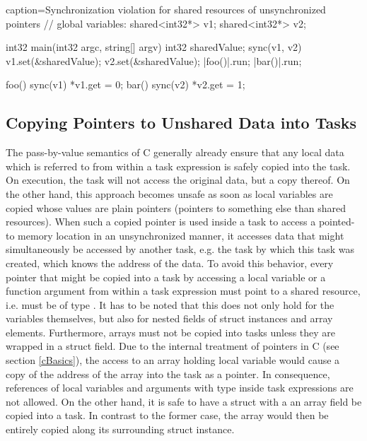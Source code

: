 \vspace{4mm}
\begin{ccode}{caption=Synchronization violation for shared resources of unsynchronized pointers}
// global variables:
shared<int32*> v1;
shared<int32*> v2;

int32 main(int32 argc, string[] argv) {
  int32 sharedValue;
  sync(v1, v2) {
    v1.set(&sharedValue);
    v2.set(&sharedValue);
  }
  |foo()|.run;
  |bar()|.run;
}

foo() {
  sync(v1) { *v1.get = 0; }
}
bar() {
  sync(v2) { *v2.get = 1; }
}
\end{ccode}

\subsection{Copying Pointers to Unshared Data into Tasks}
The pass-by-value semantics of C generally already ensure that any local data which is referred to from within a task expression is safely copied into the task. On execution, the task will not access the original data, but a copy thereof. On the other hand, this approach becomes unsafe as soon as local variables are copied whose values are plain pointers (pointers to something else than shared resources). When such a copied pointer is used inside a task to access a pointed-to memory location in an unsynchronized manner, it accesses data that might simultaneously be accessed by another task, e.g. the task by which this task was created, which knows the address of the data. To avoid this behavior, every pointer that might be copied into a task by accessing a local variable or a function argument from within a task expression must point to a shared resource, i.e. must be of type . It has to be noted that this does not only hold for the variables themselves, but also for nested fields of struct instances and array elements. Furthermore, arrays must not be copied into tasks unless they are wrapped in a struct field. Due to the internal treatment of pointers in C (see section \ref{cBasics}), the access to an array holding local variable would cause a copy of the address of the array into the task as a pointer. In consequence, references of local variables and arguments with type  inside task expressions are not allowed. On the other hand, it is safe to have a struct with a an array field be copied into a task. In contrast to the former case, the array would then be entirely copied along its surrounding struct instance.

